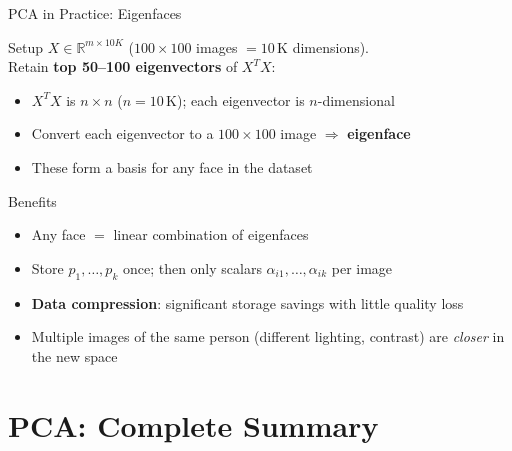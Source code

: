 \documentclass{beamer}
\begin{document}
\begin{frame}[shrink=10]{PCA in Practice: Eigenfaces}
  \begin{block}{Setup}
    $X\in\mathbb{R}^{m\times 10K}$
    ($100\times100$ images $= 10\,\text{K}$ dimensions).\\[4pt]
    Retain \textbf{top 50--100 eigenvectors} of $X^TX$:
    \begin{itemize}\setlength\itemsep{5pt}
      \item $X^TX$ is $n\times n$ ($n=10\,\text{K}$);
            each eigenvector is $n$-dimensional
      \item Convert each eigenvector to a $100\times100$ image
            $\Rightarrow$ \textbf{eigenface}
      \item These form a basis for any face in the dataset
    \end{itemize}
  \end{block}

  \medskip

  \begin{block}{Benefits}
    \begin{itemize}\setlength\itemsep{5pt}
      \item Any face $=$ linear combination of eigenfaces
      \item Store $p_1,\ldots,p_k$ once; then only scalars
            $\alpha_{i1},\ldots,\alpha_{ik}$ per image
      \item \textbf{Data compression}: significant storage savings with
            little quality loss
      \item Multiple images of the same person (different lighting,
            contrast) are \emph{closer} in the new space
    \end{itemize}
  \end{block}
\end{frame}

\section{PCA: Complete Summary}
\end{document}
